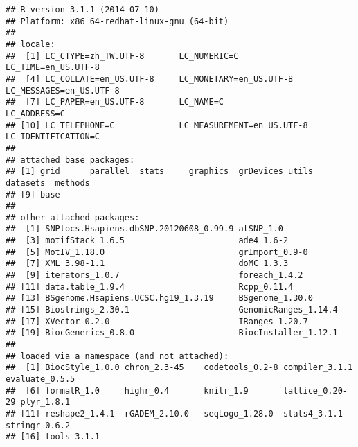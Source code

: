 \documentclass[a4paper,10pt]{article}\usepackage[]{graphicx}\usepackage[]{color}
\makeatletter
\newenvironment{kframe}{%
 \def\at@end@of@kframe{}%
 \ifinner\ifhmode%
  \def\at@end@of@kframe{\end{minipage}}%
  \begin{minipage}{\columnwidth}%
 \fi\fi%
 \def\FrameCommand##1{\hskip\@totalleftmargin \hskip-\fboxsep
 \colorbox{shadecolor}{##1}\hskip-\fboxsep
     \hskip-\linewidth \hskip-\@totalleftmargin \hskip\columnwidth}%
 \MakeFramed {\advance\hsize-\width
   \@totalleftmargin\z@ \linewidth\hsize
   \@setminipage}}%
 {\par\unskip\endMakeFramed%
 \at@end@of@kframe}
\newenvironment{knitrout}{}{} %
\makeatother
\begin{document}
\begin{knitrout}
\color{fgcolor}\begin{kframe}
\begin{verbatim}
## R version 3.1.1 (2014-07-10)
## Platform: x86_64-redhat-linux-gnu (64-bit)
## 
## locale:
##  [1] LC_CTYPE=zh_TW.UTF-8       LC_NUMERIC=C               LC_TIME=en_US.UTF-8       
##  [4] LC_COLLATE=en_US.UTF-8     LC_MONETARY=en_US.UTF-8    LC_MESSAGES=en_US.UTF-8   
##  [7] LC_PAPER=en_US.UTF-8       LC_NAME=C                  LC_ADDRESS=C              
## [10] LC_TELEPHONE=C             LC_MEASUREMENT=en_US.UTF-8 LC_IDENTIFICATION=C       
## 
## attached base packages:
## [1] grid      parallel  stats     graphics  grDevices utils     datasets  methods  
## [9] base     
## 
## other attached packages:
##  [1] SNPlocs.Hsapiens.dbSNP.20120608_0.99.9 atSNP_1.0                             
##  [3] motifStack_1.6.5                       ade4_1.6-2                            
##  [5] MotIV_1.18.0                           grImport_0.9-0                        
##  [7] XML_3.98-1.1                           doMC_1.3.3                            
##  [9] iterators_1.0.7                        foreach_1.4.2                         
## [11] data.table_1.9.4                       Rcpp_0.11.4                           
## [13] BSgenome.Hsapiens.UCSC.hg19_1.3.19     BSgenome_1.30.0                       
## [15] Biostrings_2.30.1                      GenomicRanges_1.14.4                  
## [17] XVector_0.2.0                          IRanges_1.20.7                        
## [19] BiocGenerics_0.8.0                     BiocInstaller_1.12.1                  
## 
## loaded via a namespace (and not attached):
##  [1] BiocStyle_1.0.0 chron_2.3-45    codetools_0.2-8 compiler_3.1.1  evaluate_0.5.5 
##  [6] formatR_1.0     highr_0.4       knitr_1.9       lattice_0.20-29 plyr_1.8.1     
## [11] reshape2_1.4.1  rGADEM_2.10.0   seqLogo_1.28.0  stats4_3.1.1    stringr_0.6.2  
## [16] tools_3.1.1
\end{verbatim}
\end{kframe}
\end{knitrout}


%
%



\end{document}

